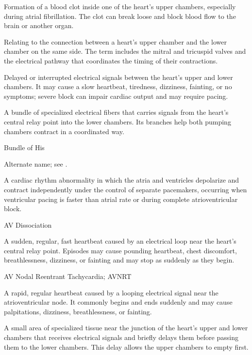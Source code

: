  Formation of a blood clot inside one of the heart’s upper chambers, especially during atrial fibrillation. The clot can break loose and block blood flow to the brain or another organ.

 Relating to the connection between a heart’s upper chamber and the lower chamber on the same side. The term includes the mitral and tricuspid valves and the electrical pathway that coordinates the timing of their contractions.

 Delayed or interrupted electrical signals between the heart’s upper and lower chambers. It may cause a slow heartbeat, tiredness, dizziness, fainting, or no symptoms; severe block can impair cardiac output and may require pacing.

 A bundle of specialized electrical fibers that carries signals from the heart’s central relay point into the lower chambers. Its branches help both pumping chambers contract in a coordinated way.

\synonyms
Bundle of His

 Alternate name; see .

 A cardiac rhythm abnormality in which the atria and ventricles depolarize and contract independently under the control of separate pacemakers, occurring when ventricular pacing is faster than atrial rate or during complete atrioventricular block.

\synonyms
AV Dissociation

 A sudden, regular, fast heartbeat caused by an electrical loop near the heart’s central relay point. Episodes may cause pounding heartbeat, chest discomfort, breathlessness, dizziness, or fainting and may stop as suddenly as they begin.

\synonyms
AV Nodal Reentrant Tachycardia; AVNRT

 A rapid, regular heartbeat caused by a looping electrical signal near the atrioventricular node. It commonly begins and ends suddenly and may cause palpitations, dizziness, breathlessness, or fainting.

 A small area of specialized tissue near the junction of the heart’s upper and lower chambers that receives electrical signals and briefly delays them before passing them to the lower chambers. This delay allows the upper chambers to empty first.

